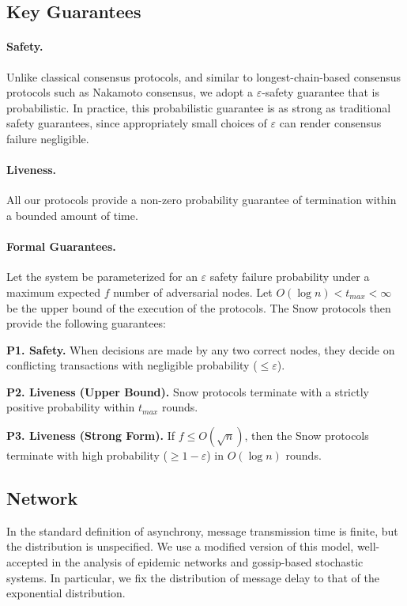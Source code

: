 \documentclass[11pt]{article}
\begin{document}
\subsection{Key Guarantees}

\paragraph{Safety.} Unlike classical consensus protocols, and similar to
longest-chain-based consensus protocols such as Nakamoto
consensus, we adopt a $\varepsilon$-safety guarantee that is probabilistic. In practice, this probabilistic guarantee is as strong as
traditional safety guarantees, since appropriately small choices
of $\varepsilon$ can render consensus failure negligible.

\paragraph{Liveness.} All our protocols provide a non-zero probability
guarantee of termination within a bounded amount of time.

\paragraph{Formal Guarantees.} Let the system be parameterized for
an $\varepsilon$ safety failure probability under a maximum expected
$f$ number of adversarial nodes. Let $O(\log n) < t_{max} < \infty$ be
the upper bound of the execution of the protocols. The Snow
protocols then provide the following guarantees:

\textbf{P1. Safety.} When decisions are made by any two correct
nodes, they decide on conflicting transactions with negligible
probability ($\leq \varepsilon$).

\textbf{P2. Liveness (Upper Bound).} Snow protocols terminate
with a strictly positive probability within $t_{max}$ rounds.

\textbf{P3. Liveness (Strong Form).} If $f \leq O(\sqrt{n})$, then the Snow
protocols terminate with high probability ($\geq 1-\varepsilon$) in $O(\log n)$
rounds.

\subsection{Network}

In the standard definition of asynchrony, message transmission time is finite, but the distribution is unspecified. We use a modified version
of this model, well-accepted in the analysis of epidemic networks and gossip-based stochastic
systems. In particular, we fix the distribution of message delay
to that of the exponential distribution.
\end{document}

